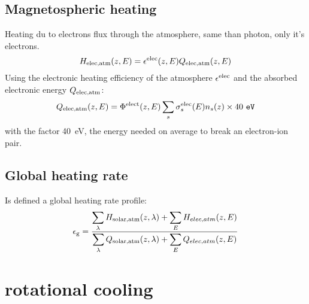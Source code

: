 \subsection{Magnetospheric heating}

Heating du to electrons flux through the atmosphere, same than
photon, only it's electrons.
\begin{equation}
H_{\text{elec,atm}}(z,E) = \epsilon^{\text{elec}}(z,E)Q_{\text{elec,atm}}(z,E)
\label{Titan:elec-heat-rate}
\end{equation}
Using the electronic heating efficiency of the atmosphere $\epsilon^{\text{elec}}$ and
the absorbed electronic energy $Q_{\text{elec,atm}}$:
\begin{equation}
Q_{\text{elec,atm}}(z,E) = \Phi^{\text{elect}}(z,E)\sum_s \sigma^{\text{elec}}_s(E)n_s(z) \times 40~\mathtt{eV}
\label{Titan:elec-heat}
\end{equation}
with the factor 40~\unit{eV}, the energy needed on average to break an
electron-ion pair.

\subsection{Global heating rate}

Is defined a global heating rate profile:
\begin{equation}
\epsilon_\text{g} = \frac{\displaystyle\sum_\lambda H_{\text{solar,atm}}(z,\lambda) + 
                          \displaystyle\sum_EH_{elec,atm}(z,E)}
                         {\displaystyle\sum_\lambda Q_{\text{solar,atm}}(z,\lambda) + 
                          \displaystyle\sum_EQ_{elec,atm}(z,E)}
\label{Titan:global-heat}
\end{equation}

\section{\texorpdfstring{ rotational cooling}{Hydrogen cyanide rotational cooling}}
